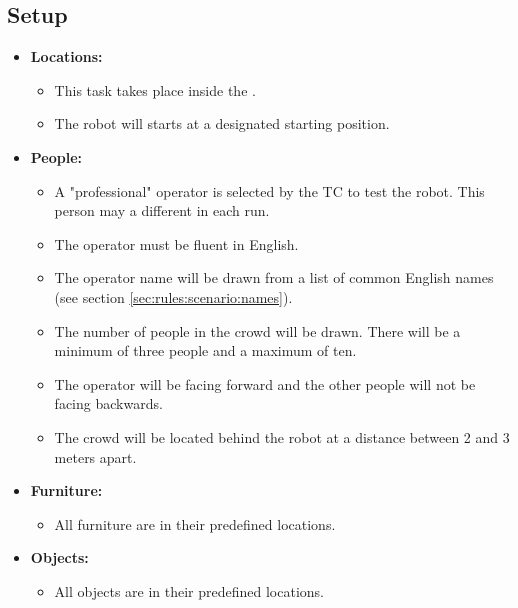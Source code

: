 \subsection*{Setup}
\begin{itemize}[nosep]	
	\item \textbf{Locations:} 
	\begin{itemize}
		\item This task takes place inside the \Arena{}.
		\item The robot will starts at a designated starting position. 
	\end{itemize}
	\item \textbf{People:} 
	\begin{itemize}
		\item A "professional" operator is selected by the TC to test the robot. This person may a different in each run. 
		\item The operator must be fluent in English. 
		\item The operator name will be drawn from a list of common English names (see section \ref{sec:rules:scenario:names}).
		\item The number of people in the crowd will be drawn. There will be a minimum of three people and a maximum of ten.
		\item The operator will be facing forward and the other people will not be facing backwards.
		\item The crowd will be located behind the robot at a distance between 2 and 3 meters apart.
	\end{itemize}
	\item \textbf{Furniture:} 
	\begin{itemize}
		\item All furniture are in their predefined locations.
	\end{itemize}
    \item \textbf{Objects:} 
    \begin{itemize}
		\item All objects are in their predefined locations.
	\end{itemize}
\end{itemize}

